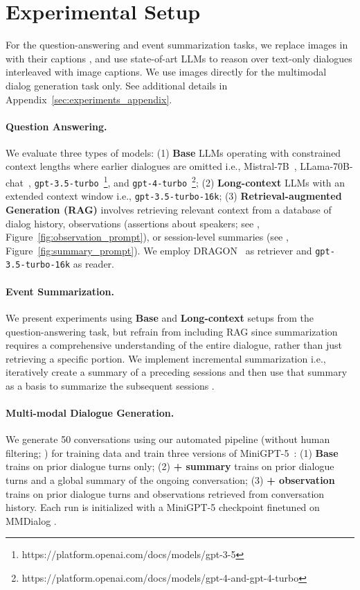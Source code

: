 \section{Experimental Setup}
\label{sec:baselines}

For the question-answering and event summarization tasks, we replace images in \dataset{} with their captions \cite{li2023blip}, and use state-of-art LLMs to reason over text-only dialogues interleaved with image captions. We use images directly for the multimodal dialog generation task only. See additional details in Appendix~\ref{sec:experiments_appendix}.

\paragraph{Question Answering.}
We evaluate three types of models:
(1) \textbf{Base} LLMs operating with constrained context lengths where earlier dialogues are omitted i.e., Mistral-7B~\cite{jiang2023mistral}, LLama-70B-chat~\cite{touvron2023llama}, \texttt{gpt-3.5-turbo}~\footnote{https://platform.openai.com/docs/models/gpt-3-5}, and \texttt{gpt-4-turbo}~\footnote{https://platform.openai.com/docs/models/gpt-4-and-gpt-4-turbo}; 
(2) \textbf{Long-context} LLMs with an extended context window i.e., \texttt{gpt-3.5-turbo-16k}; 
(3) \textbf{Retrieval-augmented Generation (RAG)} involves retrieving relevant context from a database of dialog history, observations (assertions about speakers; see , Figure~\ref{fig:observation_prompt}), or session-level summaries (see , Figure~\ref{fig:summary_prompt}). We employ DRAGON~\cite{lin-etal-2023-train} as retriever and \texttt{gpt-3.5-turbo-16k} as reader.


\paragraph{Event Summarization.}
We present experiments using \textbf{Base} and \textbf{Long-context} setups from the question-answering task, but refrain from including RAG since summarization requires a comprehensive understanding of the entire dialogue, rather than just retrieving a specific portion. We implement incremental summarization i.e., iteratively create a summary of a preceding sessions and then use that summary as a basis to summarize the subsequent sessions \cite{chang2023booookscore}.

\paragraph{Multi-modal Dialogue Generation.}
We generate 50 conversations using our automated pipeline (without human filtering; ) for training data and train three versions of MiniGPT-5~\cite{zheng2023minigpt}:
(1) \textbf{Base} trains on prior dialogue turns only;
(2) \textbf{+ summary} trains on prior dialogue turns and a global summary of the ongoing conversation;
(3) \textbf{+ observation} trains on prior dialogue turns and observations retrieved from conversation history.
Each run is initialized with a MiniGPT-5 checkpoint finetuned on MMDialog \cite{feng2023mmdialog}.



